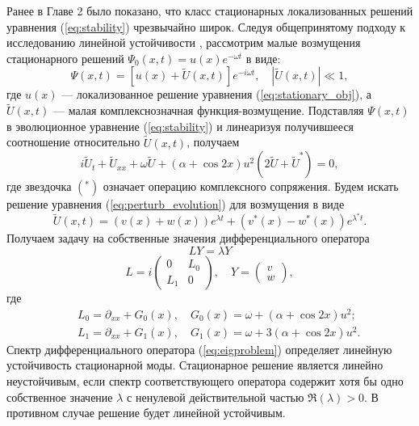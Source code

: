 Ранее в Главе 2 было показано, что класс стационарных локализованных решений уравнения (\ref{eq:stability}) чрезвычайно широк.
Следуя общепринятому подходу к исследованию линейной устойчивости \cite{JYang}, рассмотрим малые возмущения стационарного решений $\Psi_0(x,t) = u(x)e^{- \omega t}$ в виде:
%
\begin{equation}
\Psi(x,t) = \left[ u(x) +  \widetilde{U}(x,t) \right] e^{-i \omega t}, \quad \left|\widetilde{U}(x,t) \right| \ll 1,
\label{eq:perturbation}
\end{equation}
%
где $u(x)$ --- локализованное решение уравнения (\ref{eq:stationary_obj}), а $\widetilde{U}(x,t)$ --- малая комплекснозначная функция-возмущение.
Подставляя $\Psi(x,t)$ в эволюционное уравнение (\ref{eq:stability}) и линеаризуя получившееся соотношение относительно $\widetilde{U}(x,t)$, получаем
%
\begin{equation}
i \widetilde{U}_t + \widetilde{U}_{xx} + \omega \widetilde{U} + (\alpha + \cos 2x)u^2 (2 \widetilde{U} + \widetilde{U}^*) = 0,
\label{eq:perturb_evolution}
\end{equation}
%
где звездочка $(^*)$ означает операцию комплексного сопряжения.
Будем искать решение уравнения (\ref{eq:perturb_evolution}) для возмущения в виде
%
\begin{equation}
\widetilde{U}(x,t) = (v(x) + w(x))e^{\lambda t} + (v^*(x) - w^*(x))e^{\lambda^* t}.
\label{eq:seeking}
\end{equation}
%
Получаем задачу на собственные значения дифференциального оператора
%
\begin{equation}
LY = \lambda Y
\label{eq:eigproblem}
\end{equation}
%
\begin{equation}
L = i \begin{pmatrix}
0 & L_0 \\
L_1 & 0
\end{pmatrix}, \quad
Y = \begin{pmatrix}
v \\
w
\end{pmatrix},
\label{eq:operators}
\end{equation}
%
где
%
\begin{eqnarray*}
&& L_0 = \partial_{xx} + G_0(x), \quad G_0(x) = \omega + (\alpha + \cos 2x) u^2; \\
&& L_1 = \partial_{xx} + G_1(x), \quad G_1(x) = \omega + 3(\alpha + \cos 2x) u^2.
\end{eqnarray*}
%
Спектр дифференциального оператора (\ref{eq:eigproblem}) определяет линейную устойчивость стационарной моды.
Стационарное решение является линейно неустойчивым, если спектр соответствующего оператора содержит хотя бы одно собственное значение $\lambda$ с ненулевой действительной частью $\Re(\lambda) > 0$.
В противном случае решение будет линейной устойчивым.

